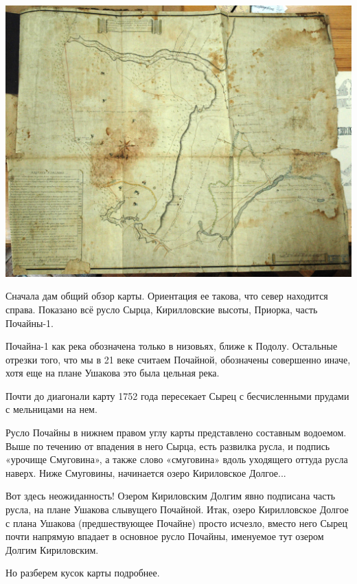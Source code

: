 \begin{center}
\includegraphics[width=\linewidth]{chast-colebanie-osnov/pochayna/map1752.jpg}
\end{center}

Сначала дам общий обзор карты. Ориентация ее такова, что север находится справа. Показано всё русло Сырца, Кирилловские высоты, Приорка, часть Почайны-1.

Почайна-1 как река обозначена только в низовьях, ближе к Подолу. Остальные отрезки того, что мы в 21 веке считаем Почайной, обозначены совершенно иначе, хотя еще на плане Ушакова это была цельная река.

Почти до диагонали карту 1752 года пересекает Сырец с бесчисленными прудами с мельницами на нем. 

Русло Почайны в нижнем правом углу карты представлено составным водоемом. Выше по течению от впадения в него Сырца, есть развилка русла, и подпись «урочище Смуговина», а также слово «смуговина» вдоль уходящего оттуда русла наверх. Ниже Смуговины, начинается озеро Кириловское Долгое...

Вот здесь неожиданность! Озером Кириловским Долгим явно подписана часть русла, на плане Ушакова слывущего Почайной. Итак, озеро Кирилловское Долгое с плана Ушакова (предшествующее Почайне) просто исчезло, вместо него Сырец почти напрямую впадает в основное русло Почайны, именуемое тут озером Долгим Кириловским.

Но разберем кусок карты подробнее.

